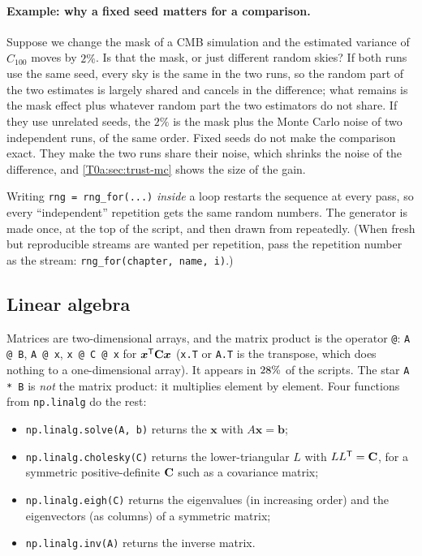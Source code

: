 \paragraph{Example: why a fixed seed matters for a comparison.} Suppose we change the mask of a CMB simulation and the estimated variance of $\hat C_{100}$ moves by $2\%$. Is that the mask, or just different random skies? If both runs use the same seed, every sky is the same in the two runs, so the random part of the two estimates is largely shared and cancels in the difference; what remains is the mask effect plus whatever random part the two estimators do not share. If they use unrelated seeds, the $2\%$ is the mask plus the Monte Carlo noise of two independent runs, of the same order. Fixed seeds do not make the comparison exact. They make the two runs share their noise, which shrinks the noise of the difference, and \cref{T0a:sec:trust-mc} shows the size of the gain.

\begin{pitfall}
Writing \texttt{rng = rng\_for(...)} \emph{inside} a loop restarts the sequence at every pass, so every ``independent'' repetition gets the same random numbers. The generator is made once, at the top of the script, and then drawn from repeatedly. (When fresh but reproducible streams are wanted per repetition, pass the repetition number as the stream: \texttt{rng\_for(chapter, name, i)}.)
\end{pitfall}

\subsection{Linear algebra}
\label{T0a:sec:linalg}

Matrices are two-dimensional arrays, and the matrix product is the operator \texttt{@}: \texttt{A @ B}, \texttt{A @ x}, \texttt{x @ C @ x} for $\bm x^{\mathsf{T}}\mathbf{C}\bm x$ (\texttt{x.T} or \texttt{A.T} is the transpose, which does nothing to a one-dimensional array). It appears in $28\%$ of the scripts. The star \texttt{A * B} is \emph{not} the matrix product: it multiplies element by element. Four functions from \texttt{np.linalg} do the rest:
\begin{itemize}[leftmargin=1.5em,itemsep=1pt]
  \item \texttt{np.linalg.solve(A, b)} returns the $\bm x$ with $A\bm x=\bm b$;
  \item \texttt{np.linalg.cholesky(C)} returns the lower-triangular $L$ with $LL^{\mathsf{T}}=\mathbf{C}$, for a symmetric positive-definite $\mathbf{C}$ such as a covariance matrix;
  \item \texttt{np.linalg.eigh(C)} returns the eigenvalues (in increasing order) and the eigenvectors (as columns) of a symmetric matrix;
  \item \texttt{np.linalg.inv(A)} returns the inverse matrix.
\end{itemize}

